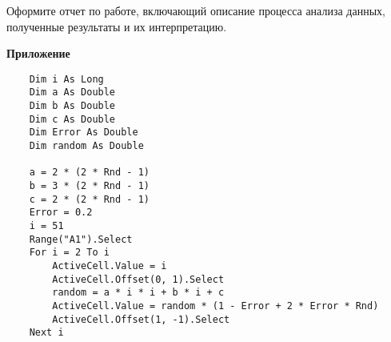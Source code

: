 \documentclass[14pt,a4paper]{article}
\begin{document}
    Оформите отчет по работе, включающий описание процесса анализа данных, полученные результаты и их интерпретацию.

\begin{center}
	\textbf{\Large Приложение}
\end{center}
	\renewcommand{\lstlistingname}{Листинг}
\begin{lstlisting}
	Dim i As Long
	Dim a As Double
	Dim b As Double
	Dim c As Double
	Dim Error As Double
	Dim random As Double

	a = 2 * (2 * Rnd - 1)
	b = 3 * (2 * Rnd - 1)
	c = 2 * (2 * Rnd - 1)
	Error = 0.2
	i = 51
	Range("A1").Select
	For i = 2 To i
		ActiveCell.Value = i
		ActiveCell.Offset(0, 1).Select
		random = a * i * i + b * i + c
		ActiveCell.Value = random * (1 - Error + 2 * Error * Rnd)
		ActiveCell.Offset(1, -1).Select
	Next i
	\end{lstlisting}
\end{document}
